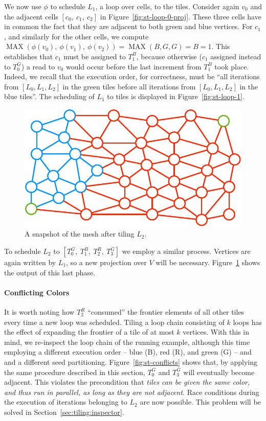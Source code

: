 We now use $\phi$ to schedule $L_1$, a loop over cells, to the tiles. Consider again $v_0$ and the adjacent cells $[c_0,\ c_1,\ c_2]$ in Figure~\ref{fig:st-loop-0-proj}. These three cells have in common the fact that they are adjacent to both green and blue vertices. For $c_1$, and similarly for the other cells, we compute $\operatorname{MAX}(\phi(v_0),\ \phi(v_1),\ \phi(v_2)) = \operatorname{MAX}(B, G, G) = B = 1$. This establishes that $c_1$ must be assigned to $T_1^B$, because otherwise ($c_1$ assigned instead to $T_0^G$) a read to $v_0$ would occur before the last increment from $T_1^B$ took place. Indeed, we recall that the execution order, for correctness, must be ``all iterations from $[L_0, L_1, L_2]$ in the green tiles before all iterations from $[L_0, L_1, L_2]$ in the blue tiles''. The scheduling of $L_1$ to tiles is displayed in Figure~\ref{fig:st-loop-1}.

\begin{figure}[h]
\centering
\includegraphics[scale=0.6]{sparsetiling/figures/loop_2.pdf}
\caption{A snapshot of the mesh after tiling $L_2$.}
\label{fig:st-loop-2}
\end{figure}

To schedule $L_2$ to $[T_0^G,\ T_1^B,\ T_2^R,\ T_3^G]$ we employ a similar process. Vertices are again written by $L_1$, so a new projection over $V$ will be necessary. Figure~\ref{fig:st-loop-2} shows the output of this last phase. 



\paragraph{Conflicting Colors}
It is worth noting how $T_2^R$ ``consumed'' the frontier elements of all other tiles every time a new loop was scheduled. Tiling a loop chain consisting of $k$ loops has the effect of expanding the frontier of a tile of at most $k$ vertices. With this in mind, we re-inspect the loop chain of the running example, although this time employing a different execution order -- blue (B), red (R), and green (G) -- and and a different seed partitioning. Figure~\ref{fig:st-conflicts} shows that, by applying the same procedure described in this section, $T_0^G$ and $T_3^G$ will eventually become adjacent. This violates the precondition that {\it tiles can be given the same color, and thus run in parallel, as long as they are not adjacent}. Race conditions during the execution of iterations belonging to $L_2$ are now possible. This problem will be solved in Section~\ref{sec:tiling:inspector}.

